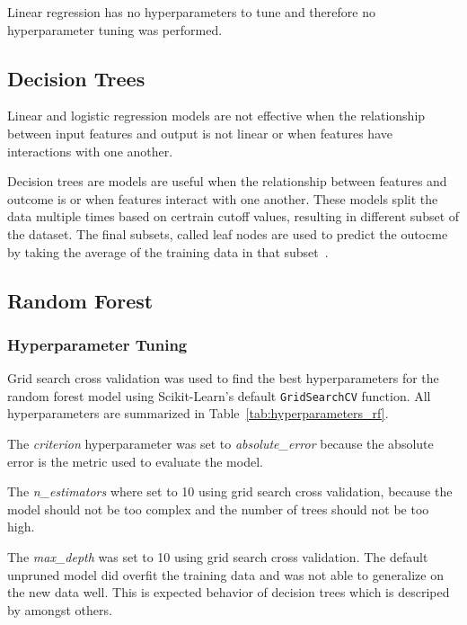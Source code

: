 Linear regression has no hyperparameters to tune and therefore no hyperparameter tuning was
performed.

\subsection{Decision Trees}\label{subsec:decision-trees}
Linear and logistic regression models are not effective when the relationship between input
features and output is not linear or when features have interactions with one another.

Decision trees are models are useful when the relationship between features and outcome is
or when features interact with one another.
These models split the data multiple times based on certrain cutoff values, resulting in
different subset of the dataset.
The final subsets, called leaf nodes are used to predict the outocme by taking the average of the
training data in that subset~\cite[p. 76]{molnar2020interpretable}.

\subsection{Random Forest}\label{subsec:random-forest}

\subsubsection*{Hyperparameter Tuning}
Grid search cross validation was used to find the best hyperparameters for the random forest
model using
Scikit-Learn's default \texttt{GridSearchCV} function.
All hyperparameters are summarized in Table~\ref{tab:hyperparameters_rf}.

The \textit{criterion} hyperparameter was set to \textit{absolute\_error} because the absolute
error is the metric
used to evaluate the model.

The \textit{n\_estimators} where set to 10 using grid search cross validation, because the model
should not be too
complex and the number of trees should not be too high.

The \textit{max\_depth} was set to 10 using grid search cross validation. The default unpruned
model did overfit the
training data and was not able to generalize on the new data well. This is expected behavior of
decision trees which
is descriped by \cite[p. 133-136]{muller_introductionmachinelearning_2016} amongst others.

